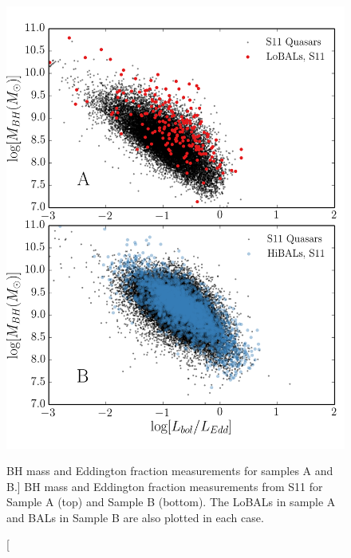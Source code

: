 \begin{figure} %
\centering
\includegraphics[width=1.0\textwidth]{figures/ewpaper/bals_2x2_scatter.png}
\caption
[BH mass and Eddington fraction measurements for samples A and B.]
{
BH mass and Eddington fraction measurements from S11 for Sample A (top)
and Sample B (bottom). The LoBALs in sample A and BALs in Sample B are
also plotted in each case.
}
\label{fig:bal_scatter}
\end{figure} %

